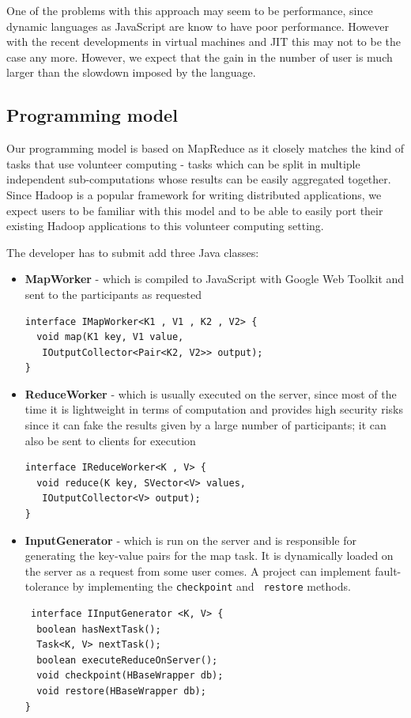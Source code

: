 \documentclass[letterpaper,twocolumn,10pt]{article}
\begin{document}
One of the problems with this approach may seem to be performance, since
dynamic languages as JavaScript are know to have poor performance. However with
the recent developments in virtual machines and JIT this may not to be the
case any more. However, we expect that the gain in the number of user is
much larger than the slowdown imposed by the language. 

\subsection{Programming model}

Our programming model is based on MapReduce as it closely matches the kind of
tasks that use volunteer computing - tasks which can be split in multiple
independent sub-computations whose results can be easily aggregated together.
Since Hadoop is a popular framework for writing distributed applications, we
expect users to be familiar with this model and to be able to easily port their
existing Hadoop applications to this volunteer computing setting. 

The developer has to submit add three Java classes: 
\begin{itemize}
  \item {\bf MapWorker} - which is compiled to JavaScript with Google Web
  Toolkit and sent to the participants as requested
  {\tt \small \begin{verbatim}
interface IMapWorker<K1 , V1 , K2 , V2> {
  void map(K1 key, V1 value, 
   IOutputCollector<Pair<K2, V2>> output);
} \end{verbatim}}

  \item {\bf ReduceWorker} - which is usually executed on the server, since most
  of the time it is lightweight in terms of computation and provides high security
  risks since it can fake the results given by a large number of participants;
  it can also be sent to clients for execution  
  {\tt \small \begin{verbatim}
interface IReduceWorker<K , V> {
  void reduce(K key, SVector<V> values, 
   IOutputCollector<V> output);
}\end{verbatim}}

  \item {\bf InputGenerator} - which is run on the server and is responsible for
  generating the key-value pairs for the map task. It is dynamically loaded
  on the server as a request from some user comes. A project can implement
  fault-tolerance by implementing the {\tt \small checkpoint} and {\tt
  \small restore} methods.
{\tt \small \begin{verbatim} interface IInputGenerator <K, V> { 
  boolean hasNextTask(); 
  Task<K, V> nextTask();
  boolean executeReduceOnServer();
  void checkpoint(HBaseWrapper db);
  void restore(HBaseWrapper db); 
}\end{verbatim}}

\end{itemize} 
\end{document}
